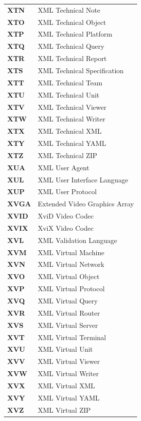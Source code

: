 \begin{longtable}{p{3cm}p{11cm}}
\textbf{XTN} & XML Technical Note \\
\textbf{XTO} & XML Technical Object \\
\textbf{XTP} & XML Technical Platform \\
\textbf{XTQ} & XML Technical Query \\
\textbf{XTR} & XML Technical Report \\
\textbf{XTS} & XML Technical Specification \\
\textbf{XTT} & XML Technical Team \\
\textbf{XTU} & XML Technical Unit \\
\textbf{XTV} & XML Technical Viewer \\
\textbf{XTW} & XML Technical Writer \\
\textbf{XTX} & XML Technical XML \\
\textbf{XTY} & XML Technical YAML \\
\textbf{XTZ} & XML Technical ZIP \\
\textbf{XUA} & XML User Agent \\
\textbf{XUL} & XML User Interface Language \\
\textbf{XUP} & XML User Protocol \\
\textbf{XVGA} & Extended Video Graphics Array \\
\textbf{XVID} & XviD Video Codec \\
\textbf{XVIX} & XviX Video Codec \\
\textbf{XVL} & XML Validation Language \\
\textbf{XVM} & XML Virtual Machine \\
\textbf{XVN} & XML Virtual Network \\
\textbf{XVO} & XML Virtual Object \\
\textbf{XVP} & XML Virtual Protocol \\
\textbf{XVQ} & XML Virtual Query \\
\textbf{XVR} & XML Virtual Router \\
\textbf{XVS} & XML Virtual Server \\
\textbf{XVT} & XML Virtual Terminal \\
\textbf{XVU} & XML Virtual Unit \\
\textbf{XVV} & XML Virtual Viewer \\
\textbf{XVW} & XML Virtual Writer \\
\textbf{XVX} & XML Virtual XML \\
\textbf{XVY} & XML Virtual YAML \\
\textbf{XVZ} & XML Virtual ZIP \\

\end{longtable}
